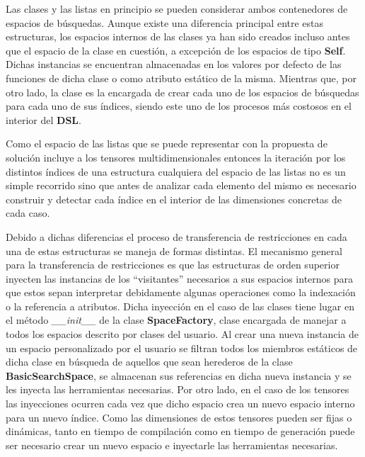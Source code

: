 Las clases y las listas en principio se pueden considerar ambos contenedores de espacios de búsquedas. Aunque existe una diferencia
principal entre estas estructuras, los espacios internos de las clases ya han sido creados incluso antes que el espacio de la clase
en cuestión, a excepción de los espacios de tipo {\bf Self}. Dichas instancias se encuentran almacenadas en los valores por defecto de
las funciones de dicha clase o como atributo estático de la misma. Mientras que, por otro lado, la clase  es la
encargada de crear cada uno de los espacios de búsquedas para cada uno de sus índices, siendo este uno de los procesos más costosos
en el interior del {\bf DSL}.

Como el espacio de las listas que se puede representar con la propuesta de solución incluye a los tensores
multidimensionales entonces la iteración por los distintos índices de una estructura cualquiera del espacio de las listas no es un
simple recorrido sino que antes de analizar cada elemento del mismo es necesario construir y detectar cada índice en el interior
de las dimensiones concretas de cada caso.

Debido a dichas diferencias el proceso de transferencia de restricciones en cada una de estas estructuras se maneja de formas
distintas. El mecanismo general para la transferencia de restricciones es que las estructuras de orden superior inyecten las
instancias de los ``visitantes'' necesarios a sus espacios internos para que estos sepan interpretar debidamente algunas operaciones
como la indexación o la referencia a atributos. Dicha inyección en el caso de las clases tiene lugar en el método \newline
{\it \_\_init\_\_} de la clase {\bf SpaceFactory}, clase encargada de manejar a todos los espacios descrito por clases del usuario. Al crear una nueva instancia
de un espacio personalizado por el usuario se filtran todos los miembros estáticos de dicha clase en búsqueda de aquellos que sean
herederos de la clase {\bf BasicSearchSpace}, se almacenan sus referencias en dicha nueva instancia y se les inyecta las herramientas
necesarias. Por otro lado, en el caso de los tensores las inyecciones ocurren cada vez que dicho espacio crea un nuevo espacio
interno para un nuevo índice. Como las dimensiones de estos tensores pueden ser fijas o dinámicas, tanto en tiempo de compilación
como en tiempo de generación puede ser necesario crear un nuevo espacio e inyectarle las herramientas necesarias.

